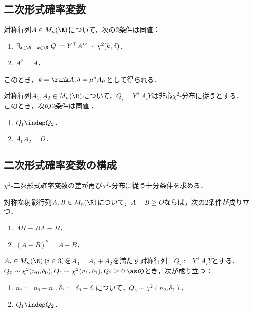 \documentclass[uplatex,dvipdfmx]{jsreport}
\begin{document}
\subsection{二次形式確率変数}

\begin{corollary}
    対称行列$A\in M_n(\R)$について，次の2条件は同値：
    \begin{enumerate}
        \item $\exists_{\delta\in\R_+,k\in\N}\;Q:=Y^\top AY\sim\chi^2(k,\delta)$．
        \item $A^2=A$．
    \end{enumerate}
    このとき，$k=\rank A,\delta=\mu^*A\mu$として得られる．
\end{corollary}

\begin{corollary}
    対称行列$A_1,A_2\in M_n(\R)$について，$Q_i=Y^\top A_iY$は非心$\chi^2$-分布に従うとする．
    このとき，次の2条件は同値：
    \begin{enumerate}
        \item $Q_1\indep Q_2$．
        \item $A_1A_2=O$．
    \end{enumerate}
\end{corollary}

\subsection{二次形式確率変数の構成}

\begin{tcolorbox}[colframe=ForestGreen, colback=ForestGreen!10!white,breakable,colbacktitle=ForestGreen!40!white,coltitle=black,fonttitle=\bfseries\sffamily,
title=]
    $\chi^2$-二次形式確率変数の差が再び$\chi^2$-分布に従う十分条件を求める．
\end{tcolorbox}

\begin{lemma}
    対称な射影行列$A,B\in M_n(\R)$について，$A-B\ge O$ならば，次の2条件が成り立つ．
    \begin{enumerate}
        \item $AB=BA=B$．
        \item $(A-B)^2=A-B$．
    \end{enumerate}
\end{lemma}

\begin{theorem}
    $A_i\in M_n(\R)\;(i\in3)$を$A_0=A_1+A_2$を満たす対称行列，$Q_i:=Y^\top A_iY$とする．
    $Q_0\sim\chi^2(n_0,\delta_0),Q_1\sim\chi^2(n_1,\delta_1),Q_2\ge0\;\as$のとき，次が成り立つ：
    \begin{enumerate}
        \item $n_2:=n_0-n_1,\delta_2:=\delta_0-\delta_1$について，$Q_2\sim\chi^2(n_2,\delta_2)$．
        \item $Q_1\indep Q_2$．
    \end{enumerate}
\end{theorem}
\end{document}
